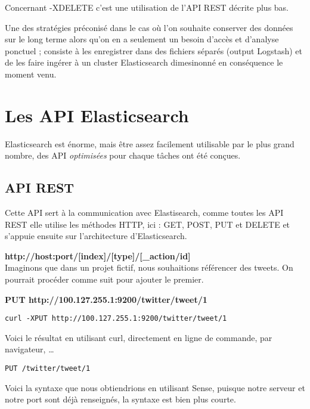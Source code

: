 Concernant -XDELETE c'est une utilisation de l'API REST décrite plus bas.

Une des stratégies préconisé dans le cas où l'on souhaite conserver des données sur
le long terme alors qu'on en a seulement un besoin d'accès et d'analyse ponctuel ;
consiste à les enregistrer dans des fichiers séparés (output Logstash) et de les 
faire ingérer à un cluster Elasticsearch dimesinonné en conséquence le moment venu.



\section{Les API Elasticsearch}
Elasticsearch est énorme, mais être assez facilement utilisable par le 
plus grand nombre, des \gls{API} \emph{optimisées} pour chaque tâches ont été conçues.

\subsection{API REST}
Cette API sert à la communication avec Elastisearch, comme toutes les API REST elle
utilise les méthodes HTTP, ici : GET, POST, PUT et DELETE et s'appuie ensuite sur l'architecture d'Elasticsearch.

\textbf{{\color{grey}http://host:port}/[{\color{red}index}]/[{\color{cyan}type}]/[{\color{yellow}\_action/id}]}\\[5mm]
Imaginons que dans un projet fictif, nous souhaitions référencer des tweets.
On pourrait procéder comme suit pour ajouter le premier.

\textbf{PUT  {\color{grey} http://100.127.255.1:9200}/{\color{red}twitter}/{\color{cyan}tweet}/{\color{yellow}1}}

\begin{lstlisting}[style=code,label={lst:RESTexemple1curl},caption={Avec curl}]
curl -XPUT http://100.127.255.1:9200/twitter/tweet/1
\end{lstlisting}
Voici le résultat en utilisant curl, directement en ligne de commande, par 
navigateur, \ldots

\begin{lstlisting}[style=code,label={lst:RESTexemple1sense},caption={Avec Sense}]
PUT /twitter/tweet/1
\end{lstlisting}

Voici la syntaxe que nous obtiendrions en utilisant Sense, puisque notre serveur 
et notre port sont déjà renseignés, la syntaxe est bien plus courte.

